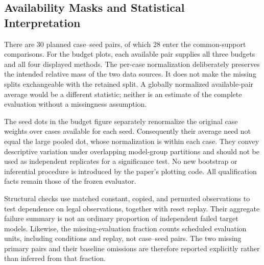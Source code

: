 \documentclass{article}
\begin{document}
\subsection{Availability Masks and Statistical Interpretation}
There are 30 planned case--seed pairs, of which 28 enter the common-support comparisons. For the budget plots, each available pair supplies all three budgets and all four displayed methods. The per-case normalization deliberately preserves the intended relative mass of the two data sources. It does not make the missing splits exchangeable with the retained split. A globally normalized available-pair average would be a different statistic; neither is an estimate of the complete evaluation without a missingness assumption.

The seed dots in the budget figure separately renormalize the original case weights over cases available for each seed. Consequently their average need not equal the large pooled dot, whose normalization is within each case. They convey descriptive variation under overlapping model-group partitions and should not be used as independent replicates for a significance test. No new bootstrap or inferential procedure is introduced by the paper's plotting code. All qualification facts remain those of the frozen evaluator.

Structural checks use matched constant, copied, and permuted observations to test dependence on legal observations, together with reset replay. Their aggregate failure summary is not an ordinary proportion of independent failed target models. Likewise, the missing-evaluation fraction counts scheduled evaluation units, including conditions and replay, not case--seed pairs. The two missing primary pairs and their baseline omissions are therefore reported explicitly rather than inferred from that fraction.
\end{document}
